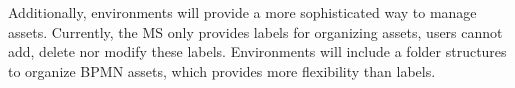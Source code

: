 Additionally, environments will provide a more sophisticated way to manage assets. 
Currently, the MS only provides labels for organizing assets, users cannot add, delete nor modify these labels.
Environments will include a folder structures to organize BPMN assets, which provides more flexibility than labels.

%
%


%
%
%


